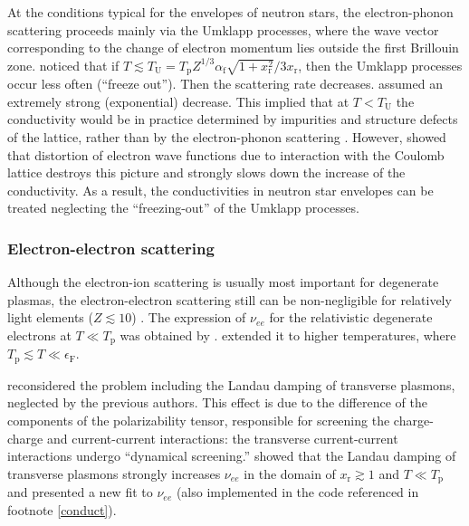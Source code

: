 \documentclass[smallextended]{svjour3}       %
\newcommand{\alphaf}{\alpha_\mathrm{f}}
\newcommand{\EF}{\epsilon_\mathrm{F}}
\newcommand{\Tp}{T_\mathrm{p}}
\newcommand{\xr}{x_\mathrm{r}}
\begin{document}
\begin{appendix}
At the conditions typical for the envelopes of neutron
stars, the electron-phonon scattering proceeds mainly via
the Umklapp processes, where the wave vector corresponding
to the change of electron momentum lies outside the first
Brillouin zone. \citet{RaikhYakovlev82} noticed that if
$T\lesssim T_\mathrm{U} = \Tp Z^{1/3} \alphaf
\sqrt{1+\xr^2}/3\xr$, then the Umklapp processes occur less
often (``freeze out''). Then the scattering rate decreases.
\citet{RaikhYakovlev82} assumed an extremely strong
(exponential) decrease. This implied that at $T <
T_\mathrm{U}$ the conductivity would be in practice
determined by impurities and structure defects of the
lattice, rather than by the electron-phonon scattering
\citep{GYP01}. However, \citet{Chugunov12} showed that
distortion of electron wave functions due to interaction
with the Coulomb lattice destroys this picture and strongly
slows down the increase of the conductivity. As a result,
the conductivities in neutron star envelopes can be treated
neglecting the ``freezing-out'' of the Umklapp processes.

\subsubsection{Electron-electron scattering}
\label{sect:ee}

Although the electron-ion scattering is usually most
important for degenerate plasmas, the electron-electron
scattering still can be non-negligible for relatively light
elements ($Z\lesssim10$) \citep{Lampe68b}. The expression of
$\nu_{ee}$ for the relativistic degenerate electrons
at $T\ll T_\mathrm{p}$ was obtained by
\citet{FlowersItoh76}. \citet{UrpinYakovlev80} extended it
to higher temperatures, where $\Tp\lesssim T\ll \EF $.

\citet{ShterninYakovlev06} reconsidered
the problem including the Landau damping of transverse
plasmons, neglected by the previous authors. This effect 
is due to the difference of the components of the
polarizability tensor, responsible for screening the
charge-charge and current-current interactions: the
transverse current-current interactions undergo  ``dynamical
screening.'' \citet{ShterninYakovlev06} showed that the
Landau damping of transverse plasmons strongly increases
$\nu_{ee}$ in the domain of $\xr \gtrsim 1$
and $T\ll \Tp$ and presented a new fit to $\nu_{ee}$
(also implemented in the code referenced in footnote
\ref{conduct}).


\end{appendix}
\end{document}
